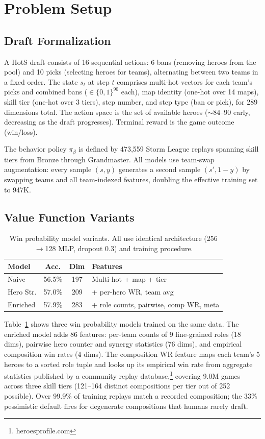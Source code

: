 \documentclass[journal]{IEEEtran}
\begin{document}
\section{Problem Setup}

\subsection{Draft Formalization}

A HotS draft consists of 16 sequential actions: 6 bans (removing heroes from the pool) and 10 picks (selecting heroes for teams), alternating between two teams in a fixed order. The state $s_t$ at step $t$ comprises multi-hot vectors for each team's picks and combined bans ($\in \{0,1\}^{90}$ each), map identity (one-hot over 14 maps), skill tier (one-hot over 3 tiers), step number, and step type (ban or pick), for 289 dimensions total. The action space is the set of available heroes ($\sim$84--90 early, decreasing as the draft progresses). Terminal reward is the game outcome (win/loss).

The behavior policy $\pi_\beta$ is defined by 473,559 Storm League replays spanning skill tiers from Bronze through Grandmaster. All models use team-swap augmentation: every sample $(s, y)$ generates a second sample $(s', 1-y)$ by swapping teams and all team-indexed features, doubling the effective training set to 947K.

\subsection{Value Function Variants}

\begin{table}[t]
\centering
\caption{Win probability model variants. All use identical architecture (256$\to$128 MLP, dropout 0.3) and training procedure.}
\label{tab:models}
\begin{tabular}{lccp{3.2cm}}
\toprule
Model & Acc. & Dim & Features \\
\midrule
Naive & 56.5\% & 197 & Multi-hot + map + tier \\
Hero Str. & 57.0\% & 209 & + per-hero WR, team avg \\
Enriched & 57.9\% & 283 & + role counts, pairwise, comp WR, meta \\
\bottomrule
\end{tabular}
\end{table}

Table~\ref{tab:models} shows three win probability models trained on the same data. The enriched model adds 86 features: per-team counts of 9 fine-grained roles (18 dims), pairwise hero counter and synergy statistics (76 dims), and empirical composition win rates (4 dims). The composition WR feature maps each team's 5 heroes to a sorted role tuple and looks up its empirical win rate from aggregate statistics published by a community replay database,\footnote{heroesprofile.com} covering 9.0M games across three skill tiers (121--164 distinct compositions per tier out of 252 possible). Over 99.9\% of training replays match a recorded composition; the 33\% pessimistic default fires for degenerate compositions that humans rarely draft.
\end{document}
